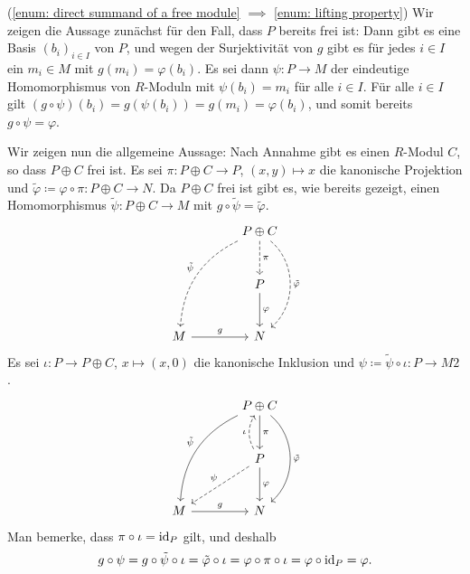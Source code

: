 \begin{solution}
  (\ref{enum: direct summand of a free module} $\implies$ \ref{enum: lifting property})
  Wir zeigen die Aussage zunächst für den Fall, dass $P$ bereits frei ist:
  Dann gibt es eine Basis $(b_i)_{i \in I}$ von $P$, und wegen der Surjektivität von $g$ gibt es für jedes $i \in I$ ein $m_i \in M$ mit $g(m_i) = \varphi(b_i)$.
  Es sei dann $\psi \colon P \to M$ der eindeutige Homomorphismus von $R$-Moduln mit $\psi(b_i) = m_i$ für alle $i \in I$.
  Für alle $i \in I$ gilt $(g \circ \psi)(b_i) = g(\psi(b_i)) = g(m_i) = \varphi(b_i)$, und somit bereits $g \circ \psi = \varphi$.
  
  Wir zeigen nun die allgemeine Aussage:
  Nach Annahme gibt es einen $R$-Modul $C$, so dass $P \oplus C$ frei ist.
  Es sei $\pi \colon P \oplus C \to P$, $(x,y) \mapsto x$ die kanonische Projektion und $\tilde{\varphi} \coloneqq \varphi \circ \pi \colon P \oplus C \to N$.
  Da $P \oplus C$ frei ist gibt es, wie bereits gezeigt, einen Ho\-mo\-mor\-phis\-mus $\tilde{\psi} \colon P \oplus C \to M$ mit $g \circ \tilde{\psi} = \tilde{\varphi}$.
  \[
    \begin{tikzcd}[row sep = large, column sep = large, ampersand replacement = \&]
          {}
      \&  P \oplus C
          \arrow[dashed]{d}{\pi}
          \arrow[dashed, bend left = 50]{dd}{\tilde{\varphi}}
          \arrow[dashed, bend right, swap]{ldd}{\tilde{\psi}}
      \\
          {}
      \&  P
          \arrow{d}{\varphi}
      \\
          M
          \arrow{r}{g}
      \&  N
    \end{tikzcd}
  \]
  Es sei $\iota \colon P \to P \oplus C$, $x \mapsto (x,0)$ die kanonische Inklusion und $\psi \coloneqq \tilde{\psi} \circ \iota \colon P \to M2$.
  \[
    \begin{tikzcd}[row sep = large, column sep = large, ampersand replacement = \&]
          {}
      \&  P \oplus C
          \arrow{d}{\pi}
          \arrow[bend left = 50]{dd}{\tilde{\varphi}}
          \arrow[bend right, swap]{ldd}{\tilde{\psi}}
      \\
          {}
      \&  P
          \arrow[dashed, bend left]{u}{\iota}
          \arrow{d}{\varphi}
          \arrow[dashed, swap]{dl}{\psi}
      \\
          M
          \arrow{r}{g}
      \&  N
    \end{tikzcd}
  \]
  Man bemerke, dass $\pi \circ \iota = \operatorname{id}_P$ gilt, und deshalb
  \[
      g \circ \psi
    = g \circ \tilde{\psi} \circ \iota
    = \tilde{\varphi} \circ \iota
    = \varphi \circ \pi \circ \iota
    = \varphi \circ \operatorname{id}_P
    = \varphi.
  \]
\end{solution}


